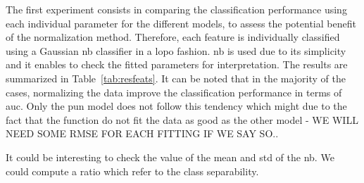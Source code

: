 
The first experiment consists in comparing the classification performance using each individual parameter for the different models, to assess the potential benefit of the normalization method.
Therefore, each feature is individually classified using a Gaussian \ac{nb} classifier in a \ac{lopo} fashion.
{\color{red}\ac{nb} is used due to its simplicity and it enables to check the fitted parameters for interpretation.}
The results are summarized in Table~\ref{tab:resfeats}.
It can be noted that in the majority of the cases, normalizing the data improve the classification performance in terms of \ac{auc}.
Only the \ac{pun} model does not follow this tendency {\color{red} which might due to the fact that the function do not fit the data as good as the other model - WE WILL NEED SOME RMSE FOR EACH FITTING IF WE SAY SO.}.

{\color{red}It could be interesting to check the value of the mean and std of the \ac{nb}. We could compute a ratio which refer to the class separability.}


